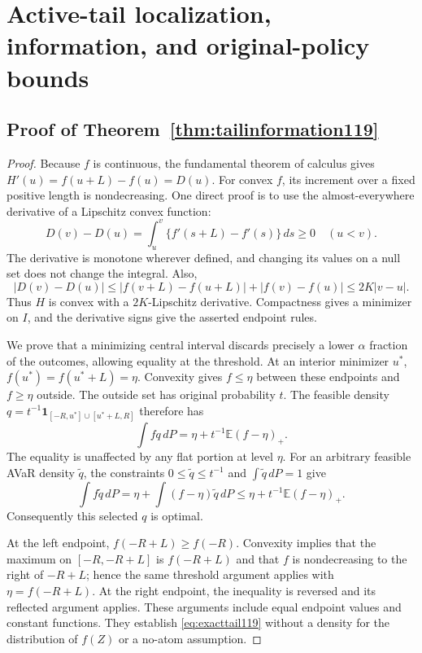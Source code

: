 \section{Active-tail localization, information, and original-policy bounds}
\label{supp:activetail119}

\subsection{Proof of Theorem~\ref{thm:tailinformation119}}
\begin{proof}
Because $f$ is continuous, the fundamental theorem of calculus gives
$H'(u)=f(u+L)-f(u)=D(u)$.  For convex $f$, its increment over a fixed
positive length is nondecreasing.  One direct proof is to use the
almost-everywhere derivative of a Lipschitz convex function:
\[
 D(v)-D(u)=\int_u^v\{f'(s+L)-f'(s)\}\,ds\ge0
 \quad(u<v).
\]
The derivative is monotone wherever defined, and changing its values on
a null set does not change the integral.  Also,
\[
 |D(v)-D(u)|\le |f(v+L)-f(u+L)|+|f(v)-f(u)|
                  \le2K|v-u|.
\]
Thus $H$ is convex with a $2K$-Lipschitz derivative.  Compactness
gives a minimizer on $I$, and the derivative signs give the asserted
endpoint rules.

We prove that a minimizing central interval discards precisely a lower
$\alpha$ fraction of the outcomes, allowing equality at the threshold.
At an interior minimizer $u^*$, $f(u^*)=f(u^*+L)=\eta$.  Convexity
gives $f\le\eta$ between these endpoints and $f\ge\eta$ outside.
The outside set has original probability $t$.  The feasible density
$q=t^{-1}\boldsymbol1_{[-R,u^*]\cup[u^*+L,R]}$ therefore has
\[
 \int fq\,dP=\eta+t^{-1}\mathbb E(f-\eta)_+.
\]
The equality is unaffected by any flat portion at level $\eta$.
For an arbitrary feasible AVaR density $\widetilde q$, the constraints
$0\le\widetilde q\le t^{-1}$ and $\int\widetilde q\,dP=1$ give
\[
 \int f\widetilde q\,dP
 =\eta+\int(f-\eta)\widetilde q\,dP
 \le\eta+t^{-1}\mathbb E(f-\eta)_+.
\]
Consequently this selected $q$ is optimal.

At the left endpoint, $f(-R+L)\ge f(-R)$.  Convexity implies that
the maximum on $[-R,-R+L]$ is $f(-R+L)$ and that $f$ is
nondecreasing to the right of $-R+L$; hence the same threshold
argument applies with $\eta=f(-R+L)$.  At the right endpoint, the
inequality is reversed and its reflected argument applies.  These
arguments include equal endpoint values and constant functions.
They establish \eqref{eq:exacttail119} without a density for the
distribution of $f(Z)$ or a no-atom assumption.


\end{proof}
